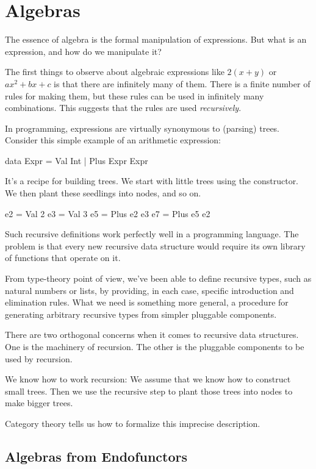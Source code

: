 \documentclass[DaoFP]{subfiles}
\begin{document}
\setcounter{chapter}{11}

\chapter{Algebras}

The essence of algebra is the formal manipulation of expressions. But what is an expression, and how do we manipulate it?

The first things to observe about algebraic expressions like $2 (x + y)$ or $a x^2 + b x + c$ is that there are infinitely many of them. There is a finite number of rules for making them, but these rules can be used in infinitely many combinations. This suggests that the rules are used \emph{recursively}. 


In programming, expressions are virtually synonymous to (parsing) trees. Consider this simple example of an arithmetic expression:
\begin{haskell}
data Expr = Val Int 
          | Plus Expr Expr
\end{haskell}
It's a recipe for building trees. We start with little trees using the  constructor. We then plant these seedlings into nodes, and so on.
\begin{haskell}
e2 = Val 2
e3 = Val 3
e5 = Plus e2 e3
e7 = Plus e5 e2
\end{haskell}

Such recursive definitions work perfectly well in a programming language. The problem is that every new recursive data structure would require its own library of functions that operate on it.

From type-theory point of view, we've been able to define recursive types, such as natural numbers or lists, by providing, in each case, specific introduction and elimination rules. What we need is something more general, a procedure for generating arbitrary recursive types from simpler pluggable components. 

There are two orthogonal concerns when it comes to recursive data structures. One is the machinery of recursion. The other is the pluggable components to be used by recursion. 

We know how to work recursion: We assume that we know how to construct small trees. Then we use the recursive step to plant those trees into nodes to make bigger trees. 

Category theory tells us how to formalize this imprecise description.

\section{Algebras from Endofunctors}
\end{document}
